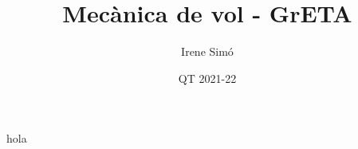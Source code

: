 \documentclass[11pt, twoside]{report}
\title{Mecànica de vol - GrETA}
\author{Irene Simó}
\date{QT 2021-22}
\begin{document}
	hola
\end{document}
